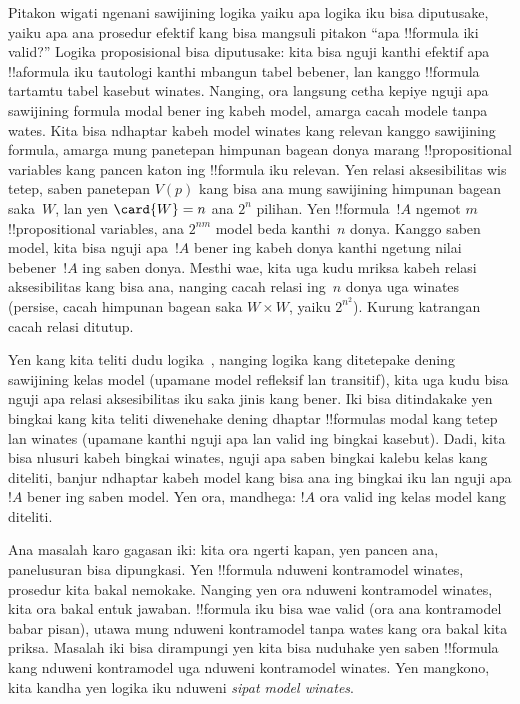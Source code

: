 \documentclass[../../../include/open-logic-section]{subfiles}
\begin{document}


Pitakon wigati ngenani sawijining logika yaiku apa logika iku bisa
diputusake, yaiku apa ana prosedur efektif kang bisa mangsuli pitakon
``apa !!{formula} iki valid?'' Logika proposisional bisa diputusake:
kita bisa nguji kanthi efektif apa !!a{formula} iku tautologi kanthi
mbangun tabel bebener, lan kanggo !!{formula} tartamtu tabel kasebut
winates. Nanging, ora langsung cetha kepiye nguji apa sawijining
formula modal bener ing kabeh model, amarga cacah modele tanpa wates.
Kita bisa ndhaptar kabeh model winates kang relevan kanggo sawijining
formula, amarga mung panetepan himpunan bagean donya marang
!!{propositional variable}s kang pancen katon ing !!{formula} iku
relevan. Yen relasi aksesibilitas wis tetep, saben panetepan $V(p)$
kang bisa ana mung sawijining himpunan bagean saka~$W$, lan yen
$\card{W} = n$ ana $2^n$ pilihan. Yen !!{formula}~$!A$ ngemot $m$
!!{propositional
  variable}s, ana $2^{nm}$ model beda kanthi~$n$ donya. Kanggo saben
model, kita bisa nguji apa~$!A$ bener ing kabeh donya kanthi ngetung
nilai bebener~$!A$ ing saben donya. Mesthi wae, kita uga kudu mriksa
kabeh relasi aksesibilitas kang bisa ana, nanging cacah relasi ing~$n$
donya uga winates (persise, cacah himpunan bagean saka $W \times W$,
yaiku $2^{n^2}$). Kurung katrangan cacah relasi ditutup.

Yen kang kita teliti dudu logika~, nanging logika kang
ditetepake dening sawijining kelas model (upamane model refleksif lan
transitif), kita uga kudu bisa nguji apa relasi aksesibilitas iku saka
jinis kang bener. Iki bisa ditindakake yen bingkai kang kita teliti
diwenehake dening dhaptar !!{formula}s modal kang tetep lan winates (upamane kanthi nguji apa
 lan  valid ing bingkai kasebut). Dadi, kita bisa nlusuri
kabeh bingkai winates, nguji apa saben bingkai kalebu kelas kang
diteliti, banjur ndhaptar kabeh model kang bisa ana ing bingkai iku
lan nguji apa $!A$ bener ing saben model. Yen ora, mandhega:
$!A$ ora valid ing kelas model kang diteliti.

Ana masalah karo gagasan iki: kita ora ngerti kapan, yen pancen ana,
panelusuran bisa dipungkasi. Yen !!{formula} nduweni kontramodel
winates, prosedur kita bakal nemokake. Nanging yen ora nduweni
kontramodel winates, kita ora bakal entuk jawaban. !!{formula} iku bisa
wae valid (ora ana kontramodel babar pisan), utawa mung nduweni
kontramodel tanpa wates kang ora bakal kita priksa. Masalah iki bisa
dirampungi yen kita bisa nuduhake yen saben !!{formula} kang nduweni
kontramodel uga nduweni kontramodel winates. Yen mangkono, kita kandha
yen logika iku nduweni \emph{sipat model winates}.
\end{document}
